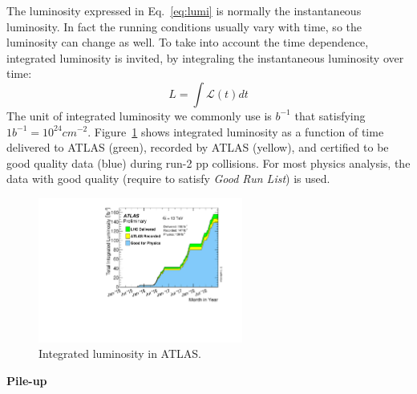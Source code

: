 The luminosity expressed in Eq.~\ref{eq:lumi} is normally the instantaneous luminosity.
In fact the running conditions usually vary with time, so the luminosity can change as well.
To take into account the time dependence, integrated luminosity is invited, by integraling the instantaneous luminosity over time:
\begin{equation}
	L = \int \mathcal{L}(t) dt
\end{equation}
The unit of integrated luminosity we commonly use is $b^{-1}$ that satisfying $1 b^{-1} = 10^{24} cm^{-2}$.
Figure~\ref{fig:lumi_vs_time} shows integrated luminosity as a function of time delivered to ATLAS (green), 
recorded by ATLAS (yellow), and certified to be good quality data (blue) during run-2 pp collisions.
For most physics analysis, the data with good quality (require to satisfy \textit{Good Run List}) is used.
\begin{figure}[!htb]
  \centering
  \includegraphics[width=0.6\textwidth]{figures/Detector/intlumivstimeRun2DQall.pdf}
  \caption{Integrated luminosity in ATLAS.}
  \label{fig:lumi_vs_time}
\end{figure}

\textbf{Pile-up}

